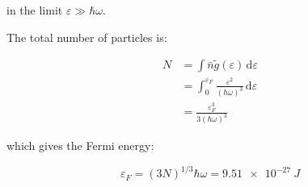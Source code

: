 \documentclass[12pt]{article}
\begin{document}
in the limit $\varepsilon \gg \hbar \omega$.

The total number of particles is:

\begin{equation}
    \begin{split}
        N &= \int \bar{n} \tilde{g}(\varepsilon) \, \mathrm{d}\varepsilon \\
        &= \int_{0}^{\varepsilon_{F}} \frac{\varepsilon^{2}}{(\hbar \omega)^{3}} \, \mathrm{d}\varepsilon \\
        &= \frac{\varepsilon_{F}^{3}}{3(\hbar \omega)^{3}}
    \end{split}
\end{equation}

which gives the Fermi energy:

\begin{equation}
    \varepsilon_{F} = (3N)^{1/3} \hbar \omega = \qty{9.51e-27}{J}
\end{equation}
\end{document}

